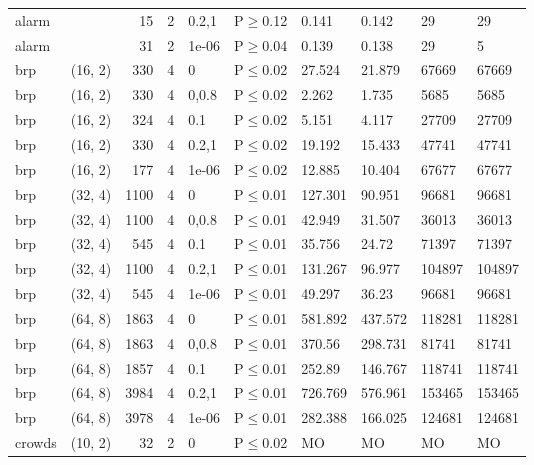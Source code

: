\begin{longtable}{llrrllllll}
 alarm         &          &     	15 &   2 & 0.2,1 & P$\geq$0.12  & 0.141   & 0.142   & 29      & 29     \\
 alarm         &          &     	31 &   2 & 1e-06 & P$\geq$0.04  & 0.139   & 0.138   & 29      & 5      \\
 brp           & (16, 2)  &    	330 &   4 & 0     & P$\leq$0.02  & 27.524  & 21.879  & 67669   & 67669  \\
 brp           & (16, 2)  &    	330 &   4 & 0,0.8 & P$\leq$0.02  & 2.262   & 1.735   & 5685    & 5685   \\
 brp           & (16, 2)  &    	324 &   4 & 0.1   & P$\leq$0.02  & 5.151   & 4.117   & 27709   & 27709  \\
 brp           & (16, 2)  &    	330 &   4 & 0.2,1 & P$\leq$0.02  & 19.192  & 15.433  & 47741   & 47741  \\
 brp           & (16, 2)  &    	177 &   4 & 1e-06 & P$\leq$0.02  & 12.885  & 10.404  & 67677   & 67677  \\
 brp           & (32, 4)  &   	1100 &   4 & 0     & P$\leq$0.01  & 127.301 & 90.951  & 96681   & 96681  \\
 brp           & (32, 4)  &   	1100 &   4 & 0,0.8 & P$\leq$0.01  & 42.949  & 31.507  & 36013   & 36013  \\
 brp           & (32, 4)  &    	545 &   4 & 0.1   & P$\leq$0.01  & 35.756  & 24.72   & 71397   & 71397  \\
 brp           & (32, 4)  &   	1100 &   4 & 0.2,1 & P$\leq$0.01  & 131.267 & 96.977  & 104897  & 104897 \\
 brp           & (32, 4)  &    	545 &   4 & 1e-06 & P$\leq$0.01  & 49.297  & 36.23   & 96681   & 96681  \\
 brp           & (64, 8)  &   	1863 &   4 & 0     & P$\leq$0.01  & 581.892 & 437.572 & 118281  & 118281 \\
 brp           & (64, 8)  &   	1863 &   4 & 0,0.8 & P$\leq$0.01  & 370.56  & 298.731 & 81741   & 81741  \\
 brp           & (64, 8)  &   	1857 &   4 & 0.1   & P$\leq$0.01  & 252.89  & 146.767 & 118741  & 118741 \\
 brp           & (64, 8)  &   	3984 &   4 & 0.2,1 & P$\leq$0.01  & 726.769 & 576.961 & 153465  & 153465 \\
 brp           & (64, 8)  &   	3978 &   4 & 1e-06 & P$\leq$0.01  & 282.388 & 166.025 & 124681  & 124681 \\
 crowds        & (10, 2)  &     	32 &   2 & 0     & P$\leq$0.02  & MO      & MO      & MO      & MO     \\

\end{longtable}
